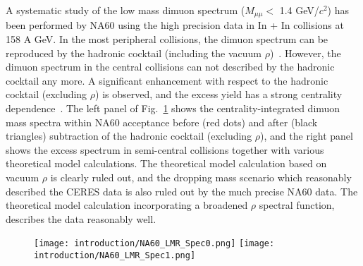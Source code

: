 A systematic study of the low mass dimuon spectrum ($M_{\mu\mu}<$ 1.4 GeV/$c^{2}$) has been performed by NA60 using the high precision data in In + In collisions at 158 A GeV. In the most peripheral collisions, the dimuon spectrum can be reproduced by the hadronic cocktail (including the vacuum $\rho$)~\cite{NA60:dimuon0}. However, the dimuon spectrum in the central collisions can not described by the hadronic cocktail any more. A significant enhancement with respect to the hadronic cocktail (excluding $\rho$) is observed, and the excess yield has a strong centrality dependence~\cite{NA60:dimuon3}. The left panel of Fig.~\ref{NA60_LMR_excess} shows the centrality-integrated dimuon mass spectra within NA60 acceptance before (red dots) and after (black triangles) subtraction of the hadronic cocktail (excluding $\rho$), and the right panel shows the excess spectrum in semi-central collisions together with various theoretical model calculations. The theoretical model calculation based on vacuum $\rho$ is clearly ruled out, and the dropping mass scenario which reasonably described the CERES data is also ruled out by the much precise NA60 data. The theoretical model calculation incorporating a broadened $\rho$ spectral function, describes the data reasonably well.

\begin{figure}[htbp]
\centering
\texttt{[image: introduction/NA60\_LMR\_Spec0.png]}
\texttt{[image: introduction/NA60\_LMR\_Spec1.png]}
 \label{NA60_LMR_excess}
\end{figure}

